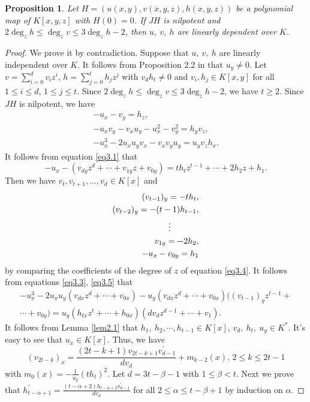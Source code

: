 \documentclass[12pt, twoside, leqno]{article}
\newtheorem{prop}[thm]{Proposition}
\theoremstyle{definition}
\numberwithin{equation}{section}
\begin{document}
\begin{prop}\label{prop3.1}
Let $H=(u(x,y),v(x,y,z),h(x,y,z))$ be a polynomial map of $K[x,y,z]$ with $H(0)= 0$. If $JH$ is nilpotent and $2\deg_zh\leq\deg_zv\leq 3\deg_zh-2$, then $u,~v,~h$ are linearly dependent over $K$.
\end{prop}
\begin{proof}
We prove it by contradiction. Suppose that $u,~v,~h$ are linearly independent over $K$. It follows from Proposition 2.2 in \cite{13} that $u_y\neq 0$. Let $v=\sum_{i=0}^dv_iz^i$, $h=\sum_{j=0}^th_jz^j$ with $v_dh_t\neq 0$ and $v_i, h_j\in K[x,y]$ for all $1\leq i\leq d$, $1\leq j\leq t$. Since $2\deg_zh\leq\deg_zv\leq 3\deg_zh-2$, we have $t\geq 2$. Since $JH$ is nilpotent, we have
\begin{eqnarray}
-u_{x}-v_{y}=h_{z},\label{eq3.1}\\
-u_{x}v_{y}-v_{x}u_{y}-u_{x}^{2}-v_{y}^{2}=h_{y}v_{z},\label{eq3.2}\\
-u_{x}^{3}-2u_{x}u_{y}v_{x}-v_{x}v_{y}u_{y}=u_{y}v_{z}h_{x}.\label{eq3.3}
\end{eqnarray}
It follows from equation \eqref{eq3.1} that
\begin{equation}\label{eq3.4}
-u_{x}-(v_{dy}z^{d}+\cdots+v_{1y}z+v_{0y})=th_{t}z^{t-1}+\cdots+2h_{2}z+h_{1}.
\end{equation}
Then we have $v_t,v_{t+1},\ldots,v_d\in K[x]$ and
\begin{eqnarray}
(v_{t-1})_y=-th_{t},\notag\\
	(v_{t-2})_y=-(t-1)h_{t-1},\notag\\
	\vdots~~~~~~~~~~\label{eq3.5}\\
	v_{1y}=-2h_{2},\notag\\
	-u_{x}-v_{0y}=h_{1}\notag
\end{eqnarray}
by comparing the coefficients of the degree of $z$ of equation \eqref{eq3.4}. It follows from equations \eqref{eq3.3}, \eqref{eq3.5} that
\begin{equation}\label{eq3.6}
\begin{split}
-u_{x}^{3}-2u_{x}u_{y}(v_{dx}z^{d}+\cdots+v_{0x})-u_{y}(v_{dx}z^{d}+\cdots+v_{0x})( (v_{t-1})_yz^{t-1}+\\\cdots+v_{0y})
	=u_{y}(h_{tx}z^{t}+\cdots+h_{0x})(dv_{d}z^{d-1}+\cdots+v_{1}).
\end{split}
\end{equation}
It follows from Lemma \ref{lem2.1} that $h_1,~h_2,\cdots,h_{t-1}\in K[x]$, $v_d,~h_t,~u_y\in K^*$. It's easy to see that $u_x\in K[x]$. Thus, we have
\begin{equation}\label{eq3.7}
(v_{2t-k})_x=\frac{(2t-k+1)v_{2t-k+1}v_{d-1}^{'}}{dv_{d}}+m_{k-2}(x),\,2\leq k\leq2t-1
\end{equation}
with $m_0(x)=-\frac{1}{u_y}(th_t)^2$. Let $d=3t-\beta-1$ with $1\leq\beta<t$. Next we prove that $h_{t-\alpha+1}^{'}=\frac{(t-\alpha+2)h_{t-\alpha+2}v_{d-1}^{'}}{dv_{d}}$ for all $2\leq\alpha\leq t-\beta+1$ by induction on $\alpha$.


\end{proof}
\end{document}
